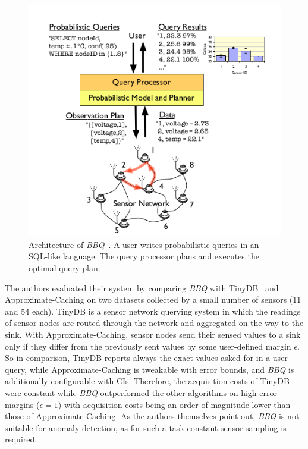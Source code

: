 \begin{figure}[h]
\includegraphics[width=\linewidth]{images/bbq-architecture.png}
\caption{Architecture of \textit{BBQ}~\cite{deshpande2004model}. A user writes
probabilistic queries in an \ac{SQL}-like language. The query processor plans
and executes the optimal query plan.}
\label{fig:bbq}
\centering
\end{figure}

The authors evaluated their system by comparing \textit{BBQ} with
TinyDB~\cite{madden2005tinydb} and Approximate-Caching on two datasets
collected by a small number of sensors (11 and 54 each). TinyDB is a sensor network
querying system in which the readings of sensor nodes are routed through the
network and aggregated on the way to the sink. With Approximate-Caching, sensor
nodes send their sensed values to a sink only if they differ from the previously
sent values by some user-defined margin $ \epsilon $. So in comparison, TinyDB
reports always the exact values asked for in a user query, while
Approximate-Caching is tweakable with error bounds, and \textit{BBQ} is
additionally configurable with \acp{CI}. Therefore, the acquisition costs of
TinyDB were constant while \textit{BBQ} outperformed the other algorithms on
high error margins ($ \epsilon = 1 $) with acquisition costs being an
order-of-magnitude lower than those of Approximate-Caching. As the authors
themselves point out, \textit{BBQ} is not suitable for anomaly detection, as
for such a task constant sensor sampling is required.

